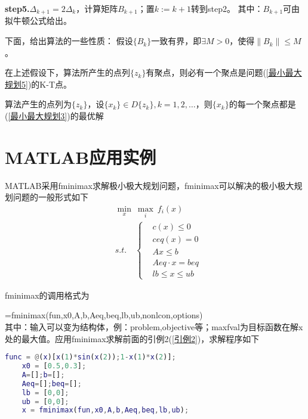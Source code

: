     \textbf{step5.}${\Delta}_{k+1}=2{\Delta}_k$，计算矩阵$B_{k+1}$；置$k:=k+1$转到step2。
    其中：$B_{k+1}$可由拟牛顿公式给出。
    \par
    下面，给出算法的一些性质：
    假设$\{B_k\}$一致有界，即$\exists M>0$，使得$\|B_k\| \leqslant M$。
    \begin{theorem}
    在上述假设下，算法所产生的点列$\{z_k\}$有聚点，则必有一个聚点是问题(\ref{最小最大规划5})的K-T点。
    \end{theorem}
    \begin{corollary}
    算法产生的点列为$\{z_k\}$，设$\{x_k\} \in D\{z_k\},k=1,2,\ldots$，则$\{x_k\}$的每一个聚点都是(\ref{最小最大规划3})的最优解
    \end{corollary}
\section{MATLAB应用实例}
    \par
    MATLAB采用fminimax求解极小极大规划问题，fminimax可以解决的极小极大规划问题的一般形式如下
    \begin{align*}
    &\mathop{\min}\limits_{x}\  \mathop{\max}\limits_{i}\ f_i(x)\\
    &s.t.\quad \left\{
    \begin{aligned}
    &c(x)\leqslant 0\\
    &ceq(x)=0\\
    &Ax\leqslant b\\
    &Aeq\cdot x=beq\\
    &lb\leqslant x\leqslant ub
    \end{aligned}
    \right.
    \end{align*}
    \par
    fminimax的调用格式为
    \par
    [x,fval,maxfval,exitflag,output,lambda]=fminimax(fun,x0,A,b,Aeq,beq,lb,ub,nonlcon,options)\\
    其中：输入可以变为结构体，例：problem,objective等；maxfval为目标函数在解x处的最大值。应用fminimax求解前面的引例2(\ref{引例2})，求解程序如下
    \lstset{flexiblecolumns}
    \begin{lstlisting}[language=Matlab]
    func = @(x)[x(1)*sin(x(2));1-x(1)*x(2)];
    x0 = [0.5,0.3];
    A=[];b=[];
    Aeq=[];beq=[];
    lb = [0,0];
    ub = [0,0];
    x = fminimax(fun,x0,A,b,Aeq,beq,lb,ub);
    \end{lstlisting}

